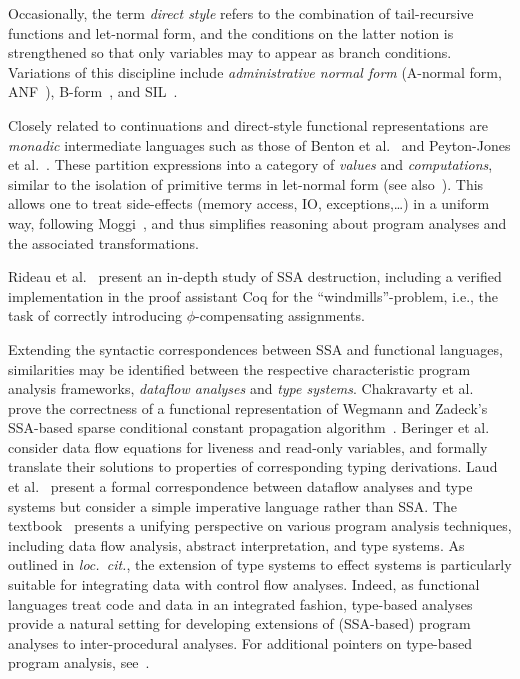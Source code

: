 Occasionally, the term \emph{direct style} refers to the combination
of tail-recursive functions and let-normal form, and the conditions on
the latter notion is strengthened so that only variables may to appear
as branch conditions. Variations of this discipline include
\emph{administrative normal form} (A-normal form,
ANF~\cite{DBLP:conf/pldi/FlanaganSDF93}),
B-form~\cite{DBLP:conf/pldi/TarditiMCSHL96}, and
SIL~\cite{DBLP:journals/jfp/TolmachO98}.

Closely related to continuations and direct-style functional
representations are \emph{monadic} intermediate languages such as
those of Benton et al.~\cite{BentonKennedyRussel:ICFP1998} and
Peyton-Jones et al.~\cite{PeytonJonesShieldsLT:POPL1998}. These
partition expressions into a category of \emph{values} and
\emph{computations}, similar to the isolation of primitive terms in
let-normal form (see also~\cite{Reynolds1974,Plotkin75}). This allows
one to treat side-effects (memory access, IO, exceptions,\ldots) in a
uniform way, following Moggi~\cite{Moggi1991}, and thus simplifies
reasoning about program analyses and the associated transformations.

Rideau et al.~\cite{DBLP:journals/jar/RideauSL08} present an in-depth
study of SSA destruction, including a verified implementation in the
proof assistant Coq for the ``windmills''-problem, i.e., the task of
correctly introducing $\phi$-compensating assignments.

Extending the syntactic correspondences between SSA and functional
languages, similarities may be identified between the respective
characteristic program analysis frameworks, \emph{dataflow analyses}
and \emph{type systems}.  Chakravarty et
al.~\cite{ChakravartyKZ:COCV03} prove the correctness of a functional
representation of Wegmann and Zadeck's SSA-based sparse conditional
constant propagation algorithm~\cite{WegmannZ:Toplas1991}.  Beringer
et al.~\cite{DBLP:journals/entcs/BeringerMS03} consider data flow
equations for liveness and read-only variables, and formally translate
their solutions to properties of corresponding typing derivations.
Laud et al.~\cite{DBLP:journals/tcs/LaudUV06} present a formal
correspondence between dataflow analyses and type systems but consider
a simple imperative language rather than SSA. The
textbook~\cite{NielsonNielsonHanking:POPA} presents a unifying
perspective on various program analysis techniques, including data
flow analysis, abstract interpretation, and type systems. As outlined
in \emph{loc.~cit.}, the extension of type systems to effect systems
is particularly suitable for integrating data with control flow
analyses. Indeed, as functional languages treat code and data in an
integrated fashion, type-based analyses provide a natural setting for
developing extensions of (SSA-based) program analyses to
inter-procedural analyses. For additional pointers on type-based
program analysis, see~\cite{Palsberg}.
%

